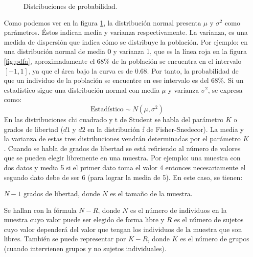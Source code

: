 \begin{figure}[h]
\centering
{}
\caption{Distribuciones de probabilidad.}
\label{fig:pdf}
\end{figure}
\newline
Como podemos ver en la figura \ref{fig:pdf}, la distribución normal presenta $\mu$ y $\sigma^2$ como parámetros.
Éstos indican media y varianza respectivamente. La varianza, es una medida de dispersión que indica cómo se
distribuye la población. Por ejemplo: en una distribución normal de media 0 y varianza 1, que es la línea roja
en la figura \ref{fig:pdfa}, aproximadamente el $68\%$ de la población se encuentra en el intervalo $[-1,1]$,
ya que el área bajo la curva es de 0.68. Por tanto, la probabilidad de que un individuo de la población se
encuentre en ese intervalo es del 68\%. Si un estadístico sigue una distribución normal con media $\mu$ y
varianza $\sigma^2$, se expresa como:
\[ \mbox{Estadístico} \sim N(\mu,\sigma^2) \]
En las distribuciones chi cuadrado y t de Student se habla del parámetro $K$ o grados de libertad ($d1$ y $d2$  en
la distribución f de Fisher-Snedecor). La media y la varianza de estas tres distribuciones vendrán determinadas por
el parámetro $K$. Cuando se habla de grados de libertad se está refiriendo al número de valores que se pueden elegir
libremente en una muestra. Por ejemplo: una muestra con dos datos y media 5 si el primer dato toma el valor 4 entonces
necesariamente el segundo dato debe de ser 6 (para lograr la media de 5). En este caso, se tienen:
\begin{center}
$N - 1$ grados de libertad, donde $N$ es el tamaño de la muestra.
\end{center}
Se hallan con la fórmula $N-R$, donde $N$ es el número de individuos en la muestra cuyo valor puede ser elegido de
forma libre y $R$ es el número de sujetos cuyo valor dependerá del valor que tengan los individuos de la muestra que
son libres. También se puede representar por $K-R$, donde $K$ es el número de grupos (cuando intervienen grupos y
no sujetos individuales).

